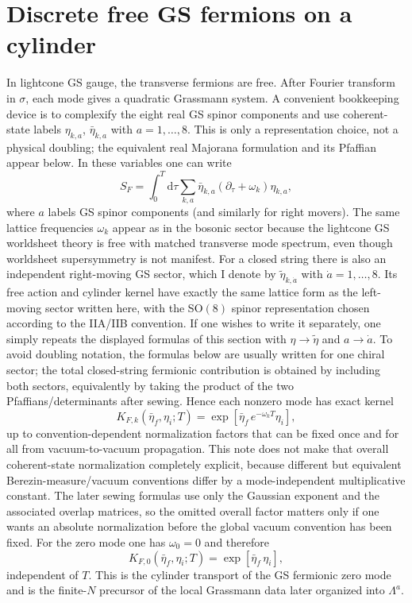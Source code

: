 \documentclass[11pt]{article}
\numberwithin{equation}{section}
\newcommand{\dd}{\mathrm{d}}
\begin{document}
\section{Discrete free GS fermions on a cylinder}
In lightcone GS gauge, the transverse fermions are free. After Fourier transform in $\sigma$, each mode gives a quadratic Grassmann system. A convenient bookkeeping device is to complexify the eight real GS spinor components and use coherent-state labels $\eta_{k,a}$, $\bar\eta_{k,a}$ with $a=1,\dots,8$. This is only a representation choice, not a physical doubling; the equivalent real Majorana formulation and its Pfaffian appear below. In these variables one can write
\begin{equation}
\label{eq:s6-001}
S_F=\int_0^T\dd\tau\sum_{k,a}\bar\eta_{k,a}(\partial_\tau+\omega_k)\eta_{k,a},
\end{equation}
where $a$ labels GS spinor components (and similarly for right movers). The same lattice frequencies $\omega_k$ appear as in the bosonic sector because the lightcone GS worldsheet theory is free with matched transverse mode spectrum, even though worldsheet supersymmetry is not manifest.
For a closed string there is also an independent right-moving GS sector, which I denote by $\widetilde\eta_{k,\dot a}$ with $\dot a=1,\dots,8$. Its free action and cylinder kernel have exactly the same lattice form as the left-moving sector written here, with the SO$(8)$ spinor representation chosen according to the IIA/IIB convention. If one wishes to write it separately, one simply repeats the displayed formulas of this section with $\eta\to\widetilde\eta$ and $a\to\dot a$. To avoid doubling notation, the formulas below are usually written for one chiral sector; the total closed-string fermionic contribution is obtained by including both sectors, equivalently by taking the product of the two Pfaffians/determinants after sewing.
Hence each nonzero mode has exact kernel
\begin{equation}
\label{eq:s6-002}
K_{F,k}(\bar\eta_f,\eta_i;T)=
\exp\!\left[\bar\eta_f\,e^{-\omega_k T}\eta_i\right],
\end{equation}
up to convention-dependent normalization factors that can be fixed once and for all from vacuum-to-vacuum propagation. This note does not make that overall coherent-state normalization completely explicit, because different but equivalent Berezin-measure/vacuum conventions differ by a mode-independent multiplicative constant. The later sewing formulas use only the Gaussian exponent and the associated overlap matrices, so the omitted overall factor matters only if one wants an absolute normalization before the global vacuum convention has been fixed.
For the zero mode one has $\omega_0=0$ and therefore
\begin{equation}
\label{eq:s6-003}
K_{F,0}(\bar\eta_f,\eta_i;T)=
\exp\!\left[\bar\eta_f\,\eta_i\right],
\end{equation}
independent of $T$. This is the cylinder transport of the GS fermionic zero mode and is the finite-$N$ precursor of the local Grassmann data later organized into $\Lambda^a$.
\end{document}
